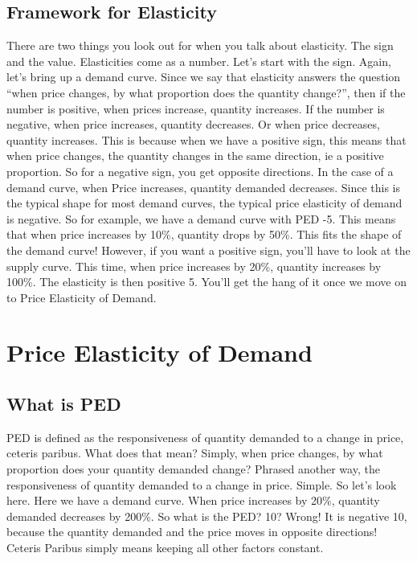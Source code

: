 \documentclass[DIV=calc,11pt,parskip,numbers=noenddot]{scrartcl} %
\begin{document}
\subsection{Framework for Elasticity}
There are two things you look out for when you talk about elasticity. The sign and the value. Elasticities come as a number. Let’s start with the sign. Again, let’s bring up a demand curve. Since we say that elasticity answers the question “when price changes, by what proportion does the quantity change?”, then if the number is positive, when prices increase, quantity increases. If the number is negative, when price increases, quantity decreases. Or when price decreases, quantity increases. This is because when we have a positive sign, this means that when price changes, the quantity changes in the same direction, ie a positive proportion. So for a negative sign, you get opposite directions. In the case of a demand curve, when Price increases, quantity demanded decreases. Since this is the typical shape for most demand curves, the typical price elasticity of demand is negative. So for example, we have a demand curve with PED -5. This means that when price increases by 10\%, quantity drops by 50\%. This fits the shape of the demand curve! However, if you want a positive sign, you’ll have to look at the supply curve. This time, when price increases by 20\%, quantity increases by 100\%. The elasticity is then positive 5. You’ll get the hang of it once we move on to Price Elasticity of Demand.
\newpage
\section{Price Elasticity of Demand}
\subsection{What is PED}
PED is defined as the responsiveness of quantity demanded to a change in price, ceteris paribus. What does that mean? Simply, when price changes, by what proportion does your quantity demanded change? Phrased another way, the responsiveness of quantity demanded to a change in price. Simple. So let’s look here. Here we have a demand curve. When price increases by 20\%, quantity demanded decreases by 200\%. So what is the PED? 10? Wrong! It is negative 10, because the quantity demanded and the price moves in opposite directions! Ceteris Paribus simply means keeping all other factors constant. 
\end{document}
